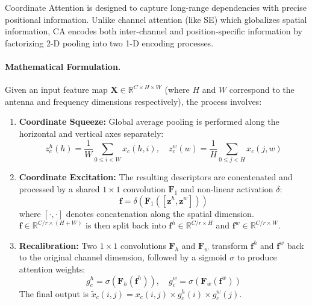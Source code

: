 \documentclass[12pt,a4paper]{article}
\begin{document}
Coordinate Attention is designed to capture long-range dependencies with precise positional information. Unlike channel attention (like SE) which globalizes spatial information, CA encodes both inter-channel and position-specific information by factorizing 2-D pooling into two 1-D encoding processes.

\paragraph{Mathematical Formulation.}
Given an input feature map $\mathbf{X} \in \mathbb{R}^{C \times H \times W}$ (where $H$ and $W$ correspond to the antenna and frequency dimensions respectively), the process involves:
\begin{enumerate}
    \item \textbf{Coordinate Squeeze:} Global average pooling is performed along the horizontal and vertical axes separately:
    \begin{equation}
        z_c^h(h) = \frac{1}{W} \sum_{0 \le i < W} x_c(h, i), \quad z_c^w(w) = \frac{1}{H} \sum_{0 \le j < H} x_c(j, w)
    \end{equation}
    \item \textbf{Coordinate Excitation:} The resulting descriptors are concatenated and processed by a shared $1 \times 1$ convolution $\mathbf{F}_1$ and non-linear activation $\delta$:
    \begin{equation}
        \mathbf{f} = \delta(\mathbf{F}_1([\mathbf{z}^h, \mathbf{z}^w]))
    \end{equation}
    where $[\cdot, \cdot]$ denotes concatenation along the spatial dimension. $\mathbf{f} \in \mathbb{R}^{C/r \times (H+W)}$ is then split back into $\mathbf{f}^h \in \mathbb{R}^{C/r \times H}$ and $\mathbf{f}^w \in \mathbb{R}^{C/r \times W}$.
    \item \textbf{Recalibration:} Two $1 \times 1$ convolutions $\mathbf{F}_h$ and $\mathbf{F}_w$ transform $\mathbf{f}^h$ and $\mathbf{f}^w$ back to the original channel dimension, followed by a sigmoid $\sigma$ to produce attention weights:
    \begin{equation}
        g_c^h = \sigma(\mathbf{F}_h(\mathbf{f}^h)), \quad g_c^w = \sigma(\mathbf{F}_w(\mathbf{f}^w))
    \end{equation}
    The final output is $\tilde{x}_c(i, j) = x_c(i, j) \times g_c^h(i) \times g_c^w(j)$.
\end{enumerate}
\end{document}
